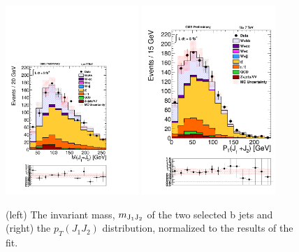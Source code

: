 \begin{figure}
\centering
\includegraphics[width=0.45\textwidth, trim = 0 4cm 0 0, clip=true ]{Wbb/fig7.pdf}
\includegraphics[width=0.45\textwidth, trim = 0 5cm 0 0, clip=true ]{Wbb/fig8.pdf}
\caption{(left) The invariant mass, $m_{\rm{J_{1} J_{2}}}$ of the two selected b jets and 
(right) the $p_{T}(J_{1} J_{2})$ distribution, normalized to the results of the fit.}
\label{fig:figE}
\end{figure}
